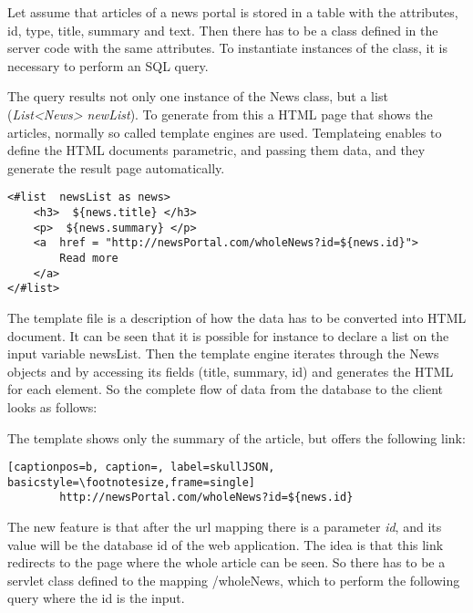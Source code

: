 Let assume that articles of a news portal is stored in a table with the attributes, id, type, title, summary and text. Then there has to be a class defined in the server code with the same attributes. To instantiate instances of the class, it is necessary to perform an SQL query.



The query results not only one instance of the News class, but a list (\textit{List<News> newList}). To generate from this a HTML page that shows the articles, normally so called template engines are used. Templateing enables to define the HTML documents parametric, and passing them data, and they generate the result page automatically.   

\begin{lstlisting}[captionpos=b, caption=Template file example, label=skullJSON,
basicstyle=\footnotesize,frame=single]
<#list  newsList as news>
	<h3>  ${news.title} </h3>
	<p>  ${news.summary} </p>
	<a  href = "http://newsPortal.com/wholeNews?id=${news.id}"> 
		Read more 
	</a>
</#list>
\end{lstlisting}


The template file is a description of how the data has to be converted into HTML document. It can be seen that it is possible for instance to declare a list on the input variable newsList. Then the template engine iterates through the News objects and by accessing its fields (title, summary, id) and generates the HTML for each element. So the complete flow of data from the database to the client looks as follows: 



The template shows only the summary of the article, but offers the following link: 

\begin{lstlisting}[captionpos=b, caption=, label=skullJSON,
basicstyle=\footnotesize,frame=single]
		http://newsPortal.com/wholeNews?id=${news.id}
\end{lstlisting}


The new feature is that after the url mapping there is a parameter \textit{id}, and its value will be the database id of the web application. The idea is that this link redirects to the page where the whole article can be seen. So there has to be a servlet class defined to the mapping /wholeNews, which to perform the following query where the id is the input.


